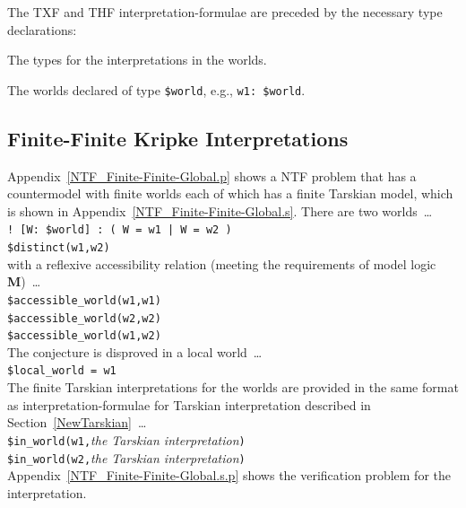 \documentclass{easychair}
\newcommand{\smalltt}[1]{\small \texttt{#1}}
\newenvironment{packed_itemize}{
\vspace*{-0.3em}
\begin{itemize}
\setlength{\partopsep}{0pt}
\setlength{\itemsep}{1pt}
\setlength{\parskip}{0pt}
\setlength{\parsep}{0pt}
}{\end{itemize}}
\begin{document}
\vspace*{0.5em}
The TXF and THF interpretation-formulae are preceded by the necessary type declarations:
\begin{packed_itemize}
\item The types for the interpretations in the worlds.
\item The worlds declared of type {\tt \$world}, e.g., {\tt w1: \$world}.
\end{packed_itemize}

\subsection{Finite-Finite Kripke Interpretations}
\label{NewKripkeFiniteFinite}

Appendix~\ref{NTF_Finite-Finite-Global.p} shows a NTF problem that has a countermodel with
finite worlds each of which has a finite Tarskian model, which is shown in
Appendix~\ref{NTF_Finite-Finite-Global.s}.
There are two worlds~\ldots \\
\hspace*{0.5cm}\smalltt{! [W: \$world] : ( W = w1 | W = w2 )} \\
\hspace*{0.5cm}\smalltt{\$distinct(w1,w2)} \\
with a reflexive accessibility relation (meeting the requirements of model logic {\bf M})~\ldots \\
\hspace*{0.5cm}\smalltt{\$accessible\_world(w1,w1)} \\
\hspace*{0.5cm}\smalltt{\$accessible\_world(w2,w2)} \\
\hspace*{0.5cm}\smalltt{\$accessible\_world(w1,w2)} \\
The conjecture is disproved in a local world~\ldots \\
\hspace*{0.5cm}\smalltt{\$local\_world = w1} \\
The finite Tarskian interpretations for the worlds are provided in the same format as
interpretation-formulae for Tarskian interpretation described in Section~\ref{NewTarskian}~\ldots \\
\hspace*{0.5cm}\smalltt{\$in\_world(w1,}{\em the Tarskian interpretation}{\tt )} \\
\hspace*{0.5cm}\smalltt{\$in\_world(w2,}{\em the Tarskian interpretation}{\tt )} \\
Appendix~\ref{NTF_Finite-Finite-Global.s.p} shows the verification problem for the interpretation.
\end{document}

